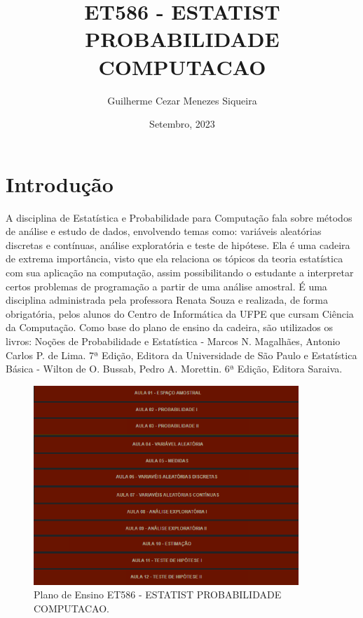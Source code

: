 \documentclass{article}
\title{ET586 - ESTATIST PROBABILIDADE COMPUTACAO}
\author{Guilherme Cezar Menezes Siqueira}
\date{Setembro, 2023}
\begin{document}
\maketitle

\section{Introdução}
\par 
A disciplina de Estatística e Probabilidade para Computação fala sobre métodos de análise e estudo de dados, envolvendo temas como: variáveis aleatórias discretas e contínuas, análise exploratória e teste de hipótese. Ela é uma cadeira de extrema importância, visto que ela relaciona os tópicos da teoria estatística com sua aplicação na computação, assim possibilitando o estudante a interpretar certos problemas de programação a partir de uma análise amostral. É uma disciplina administrada pela professora Renata Souza e realizada, de forma obrigatória, pelos alunos do Centro de Informática da UFPE que cursam Ciência da Computação. Como base do plano de ensino da cadeira, são utilizados os livros: Noções de Probabilidade e Estatística - Marcos N. Magalhães, Antonio Carlos P. de Lima. 7ª Edição, Editora da Universidade de São Paulo e Estatística Básica - Wilton de O. Bussab, Pedro A. Morettin. 6ª Edição, Editora Saraiva.
\cite{livro_base}
\cite{livro_suplementar}
\cite{site_disciplina}

\begin{figure}[h!]
\centering
    \includegraphics[width=100mm]{plano stat.png}
    \caption{Plano de Ensino ET586 - ESTATIST PROBABILIDADE COMPUTACAO. \cite{site_disciplina}}
\end{figure}
\end{document}

